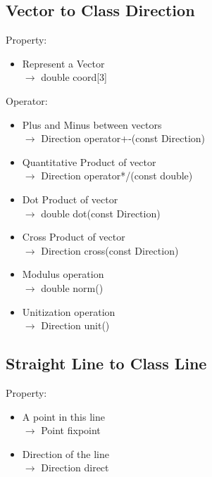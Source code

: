 \documentclass[a4paper]{book}
\numberwithin{equation}{chapter}
\theoremstyle{definition}
\begin{document}
\begin{multicols}{2}
\subsection{Vector to Class Direction}

Property:
\begin{itemize}
	\item Represent a Vector \\
	$ \longrightarrow $ double coord[3]
\end{itemize}

Operator:
\begin{itemize}
	\item[1] Plus and Minus between vectors \\
	$ \longrightarrow $ Direction operator+-(const Direction)
	
	\item[2] Quantitative Product of vector \\
	$ \longrightarrow $ Direction operator*/(const double) 
	
	\item[3] Dot Product of vector \\ 
	$ \longrightarrow $ double dot(const Direction)
	
	\item[4] Cross Product of vector \\
	$ \longrightarrow $ Direction cross(const Direction)
	
	\item[5] Modulus operation \\
	$ \longrightarrow $ double norm() 
	
	\item[6] Unitization operation \\ $ \longrightarrow $ Direction unit()
 
\end{itemize}

\subsection{Straight Line to Class Line}
Property:
\begin{itemize}
	\item A point in this line \\
	$ \longrightarrow $ Point fixpoint 
	
	\item Direction of the line \\
	$ \longrightarrow $ Direction direct
	

\end{itemize}
\end{multicols}
\end{document}
